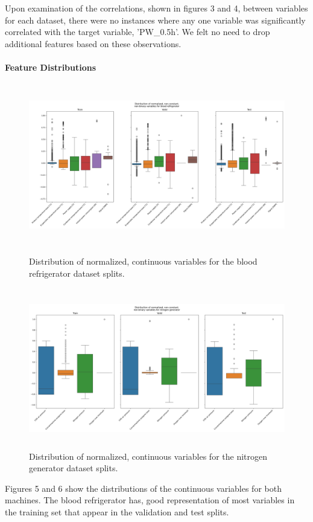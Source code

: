 \documentclass[12pt]{article}
\begin{document}
Upon examination of the correlations, shown in figures 3 and 4, between variables for each dataset, there were no instances where any one variable
was significantly correlated with the target variable, 'PW\_0.5h'. We felt no need to drop additional features based
on these observations.

\paragraph{Feature Distributions}

\begin{figure}
    \centering
    \includegraphics[height=7cm]{assets/test/blood-refrigerator/feature-distributions.png}
    \caption{Distribution of normalized, continuous variables for the blood refrigerator dataset splits.}
    \centering
    \includegraphics[height=7cm]{assets/test/nitrogen-generator/feature-distributions.png}
    \caption{Distribution of normalized, continuous variables for the nitrogen generator dataset splits.}
\end{figure}

Figures 5 and 6 show the distributions of the continuous variables for both machines. The blood refrigerator has, good representation
of most variables in the training set that appear in the validation and test splits.
 
\end{document}
